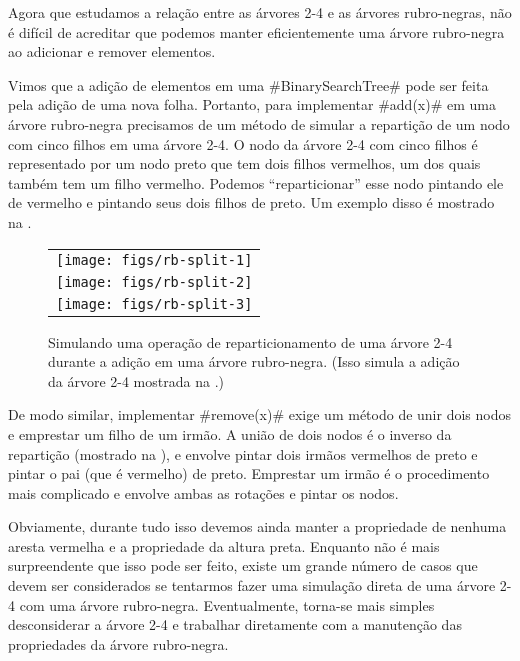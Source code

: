 Agora que estudamos a relação entre as árvores 2-4 e as 
árvores rubro-negras, não é difícil de acreditar que podemos manter eficientemente uma árvore rubro-negra ao adicionar e remover elementos. 

Vimos que a adição de elementos em uma  #BinarySearchTree#
 pode ser feita pela adição de uma nova folha. Portanto, para implementar 
#add(x)# em uma árvore rubro-negra precisamos de um método de simular
a repartição de um nodo com cinco filhos em uma 
árvore 2-4.  O nodo da árvore 2-4 com cinco filhos é representado por
um nodo preto que tem dois filhos vermelhos, um dos quais também tem um filho
vermelho. Podemos ``reparticionar'' esse nodo pintando ele de vermelho
e pintando seus dois filhos de preto. 
Um exemplo disso é mostrado na .

\begin{figure}
  \begin{center}
   \begin{tabular}{c}
     \texttt{[image: figs/rb-split-1]} \\
     \texttt{[image: figs/rb-split-2]} \\
     \texttt{[image: figs/rb-split-3]} \\
   \end{tabular}
  \end{center}
  \caption[Simulando uma árvore 2-4]{Simulando uma operação de reparticionamento de uma árvore 2-4 durante a adição em uma árvore rubro-negra. (Isso simula
  a adição da árvore 2-4 mostrada na .)}
\end{figure}

De modo similar, implementar 
#remove(x)# exige um método de unir dois nodos e emprestar um filho de um irmão.
A união de dois nodos é o inverso da repartição (mostrado na 
), e envolve pintar dois irmãos vermelhos de 
preto e pintar o pai (que é vermelho) de preto. Emprestar um 
irmão é o procedimento mais complicado
e envolve ambas as rotações e pintar os nodos.

Obviamente, durante tudo isso devemos ainda manter a propriedade de nenhuma aresta 
vermelha e a propriedade da altura preta. Enquanto não é mais surpreendente 
que isso pode ser feito, existe um grande número de casos que devem ser considerados
se tentarmos fazer uma simulação direta de uma 
árvore 2-4 com uma árvore rubro-negra. 
Eventualmente, torna-se mais simples desconsiderar a árvore 2-4 e trabalhar
diretamente com a manutenção das propriedades da árvore rubro-negra.

